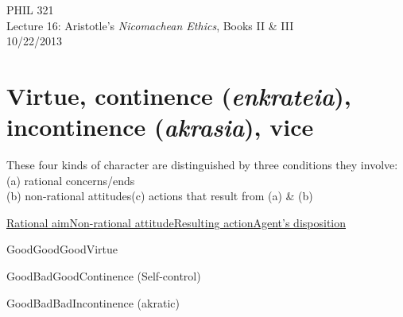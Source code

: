 \documentclass[11pt]{article}
\begin{document}
\thispagestyle{empty}
\begin{center} \LARGE{PHIL 321\\ Lecture 16: Aristotle's \emph{Nicomachean Ethics}, Books II \& III}\\ \vspace*{2mm}
\large{10/22/2013}\end{center}
\thispagestyle{empty}\vspace*{3mm}
\vspace*{-8mm}

\section*{Virtue, continence (\emph{enkrateia}), incontinence (\emph{akrasia}), vice}

\noindent These four kinds of character are distinguished by three conditions they involve: (a) rational concerns/ends\\(b) non-rational attitudes\hspace*{3mm}(c) actions that result from (a) \& (b)
\vspace*{2mm}

\noindent \underline{Rational aim\hspace*{10mm}Non-rational attitude\hspace*{10mm}Resulting action\hspace*{10mm}Agent's disposition}
\vspace*{1mm}

\noindent Good\hspace*{21mm}Good\hspace*{34mm}Good\hspace*{26mm}Virtue
\vspace*{1mm}

\noindent Good\hspace*{21mm}Bad\hspace*{37mm}Good\hspace*{26mm}Continence (Self-control)
\vspace*{1mm}

\noindent Good\hspace*{21mm}Bad\hspace*{37mm}Bad\hspace*{29mm}Incontinence (akratic)
\vspace*{1mm}
\end{document}
